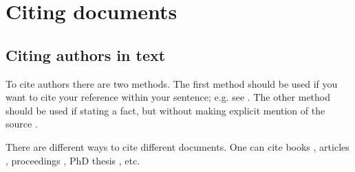 \chapter{Citing documents}

\section{Citing authors in text}

To cite authors there are two methods. The first method should be used if you
want to cite your reference within your sentence; e.g. see \citet{Author2014}.
The other method should be used if stating a fact, but without making explicit
mention of the source \citep{Author2013}.

There are different ways to cite different documents. One can cite books
\citep{Author2014}, articles \citep{Author2013}, proceedings
\citep{ConfAuthor2012}, PhD thesis \citep{Thesis2011}, etc.

